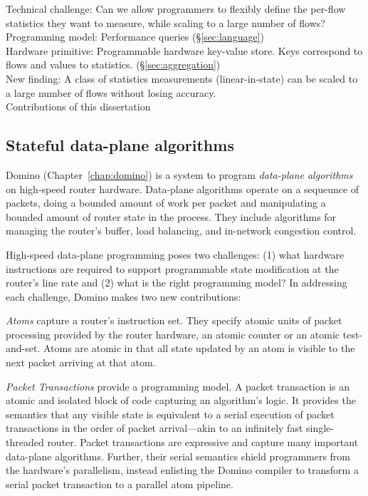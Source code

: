 \begin{table}
\begin{small}
Technical challenge: Can we allow programmers to flexibly define the per-flow
statistics they want to measure, while scaling to a large number of flows?\\

Programming model: Performance queries (\S\ref{sec:language}) \\

Hardware primitive: Programmable hardware key-value store. Keys correspond to
flows and values to statistics. (\S\ref{sec:aggregation}) \\

New finding: A class of statistics measurements (linear-in-state) can be scaled
to a large number of flows without losing accuracy.\\
\caption{Contributions of this dissertation}
\label{tab:contributions}
\end{small}
\end{table}

\subsection{Stateful data-plane algorithms}
Domino (Chapter~\ref{chap:domino}) is a system to program \textit{data-plane
algorithms} on high-speed router hardware. Data-plane algorithms operate on a
sequeunce of packets, doing a bounded amount of work per packet and
manipulating a bounded amount of router state in the process.  They include
algorithms for managing the router's buffer, load balancing, and in-network
congestion control.

High-speed data-plane programming poses two challenges: (1) what hardware
instructions are required to support programmable state modification at the
router's line rate and (2) what is the right programming model? In addressing
each challenge, Domino makes two new contributions:
\begin{CompactEnumerate}
\item \textit{Atoms} capture a router's instruction set. They specify atomic
units of packet processing provided by the router hardware, \eg an atomic
counter or an atomic test-and-set. Atoms are atomic in that all state updated
by an atom is visible to the next packet arriving at that atom.
\item \textit{Packet Transactions} provide a programming model. A packet
transaction is an atomic and isolated block of code capturing an algorithm's
logic. It provides the semantics that any visible state is equivalent to a
serial execution of packet transactions in the order of packet arrival---akin
to an infinitely fast single-threaded router. Packet transactions are
expressive and capture many important data-plane algorithms. Further, their
serial semantics shield programmers from the hardware's parallelism, instead
enlisting the Domino compiler to transform a serial packet transaction to a
parallel atom pipeline.
\end{CompactEnumerate}

